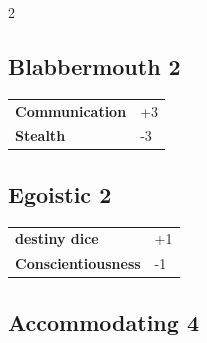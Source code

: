 \begin{multicols}{2}
\begin{tcolorbox}

\end{tcolorbox}

\begin{tcolorbox}
    \subsection*{Blabbermouth \hfill \small{2 }}
    \tcblower




\begin{tabular}{@{}ll@{}}
    \textbf{Communication} & +3\\
    \textbf{Stealth} & -3\\
\end{tabular}


\end{tcolorbox}

\begin{tcolorbox}
    \subsection*{Egoistic \hfill \small{2 }}
    \tcblower




\begin{tabular}{@{}ll@{}}
    \textbf{destiny dice} & +1\\
    \textbf{Conscientiousness} & -1\\
\end{tabular}


\end{tcolorbox}

\begin{tcolorbox}
    \subsection*{Accommodating \hfill \small{4 }}
    \tcblower





\end{tcolorbox}
\end{multicols}
